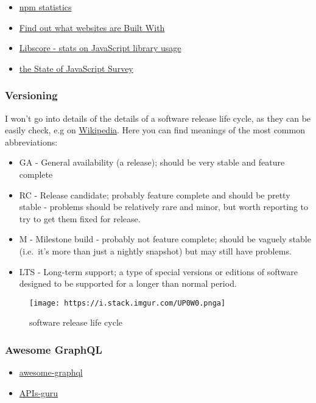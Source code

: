 \begin{itemize}
\tightlist
\item
  \href{https://npm-stat.com/}{npm statistics}
\item
  \href{https://builtwith.com/}{Find out what websites are Built With}
\item
  \href{http://libscore.com/}{Libscore - stats on JavaScript library
  usage}
\item
  \href{http://stateofjs.com/}{the State of JavaScript Survey}
\end{itemize}

\subsubsection{Versioning}\label{versioning}

I won't go into details of the details of a software release life cycle,
as they can be easily check, e.g on
\href{https://en.wikipedia.org/wiki/Software_release_life_cycle}{Wikipedia}.
Here you can find meanings of the most common abbreviations:

\begin{itemize}
\tightlist
\item
  GA - General availability (a release); should be very stable and
  feature complete
\item
  RC - Release candidate; probably feature complete and should be pretty
  stable - problems should be relatively rare and minor, but worth
  reporting to try to get them fixed for release.
\item
  M - Milestone build - probably not feature complete; should be vaguely
  stable (i.e.~it's more than just a nightly snapshot) but may still
  have problems.
\item
  LTS - Long-term support; a type of special versions or editions of
  software designed to be supported for a longer than normal period.
\end{itemize}

\begin{figure}
\centering
\texttt{[image: https://i.stack.imgur.com/UP0W0.pnga]}
\caption{software release life cycle}
\end{figure}

\subsubsection{Awesome GraphQL}\label{awesome-graphql}

\begin{itemize}
\tightlist
\item
  \href{https://github.com/chentsulin/awesome-graphql}{awesome-graphql}
\item
  \href{https://github.com/APIs-guru/graphql-apis}{APIs-guru}
\end{itemize}

